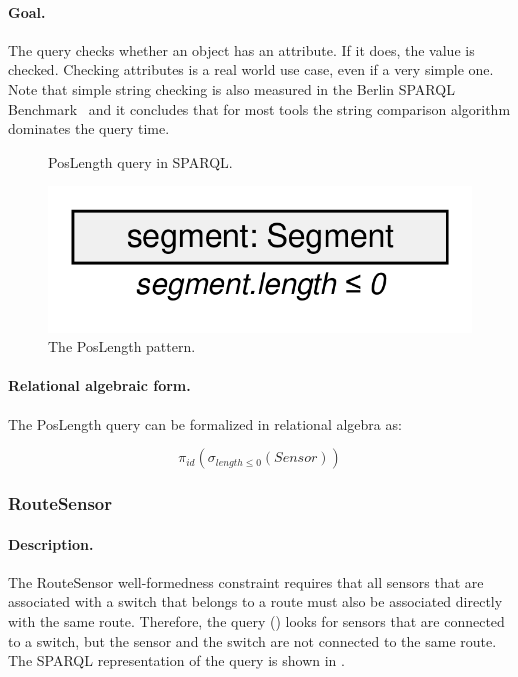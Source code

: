 \paragraph{Goal.} The query checks whether an object has an attribute. If it does, the value is checked. Checking attributes is a real world use case, even if a very simple one. Note that simple string checking is also measured in the Berlin SPARQL Benchmark~\cite{BSBM} and it concludes that for most tools the string comparison algorithm dominates the query time.

\begin{figure}[htb]
\centering
\begin{minipage}{0.9\textwidth}
  { \alignListing
    }
  \caption{\textsf{PosLength} query in SPARQL.}
  \label{lst:poslength-sparql}
\end{minipage}
\end{figure}

\begin{figure}[htb]
		\centering
		\includegraphics[scale=0.4]{figures/pattern-poslength}
		\caption{The \textsf{PosLength} pattern.}
		\label{fig:pattern-poslength}
\end{figure}

\paragraph{Relational algebraic form.} The \textsf{PosLength} query can be formalized in relational algebra as:

\[
\pi_{\mathit{id}} \left( \sigma_{\mathit{length} \leq 0} \left( \mathit{Sensor} \right) \right)
\]

\subsubsection{RouteSensor}

\paragraph{Description.} The \textsf{RouteSensor} well-formedness constraint requires that all sensors that are associated with a switch that belongs to a route must also be associated directly with the same route. Therefore, the query () looks for sensors that are connected to a switch, but the sensor and the switch are not connected to the same route. The SPARQL representation of the query is shown in .

